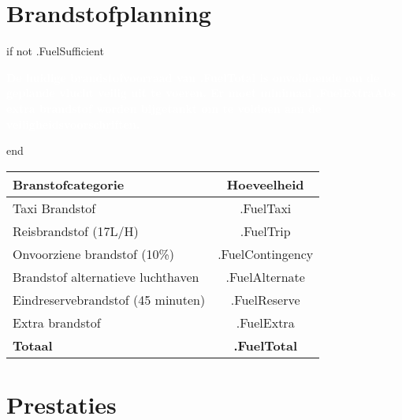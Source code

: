 \documentclass[12pt]{article}
\begin{document}
\newpage
\section*{Brandstofplanning}


{{ if not .FuelSufficient }}
{\small
\noindent
\colorbox{red!80}{%
\parbox{\textwidth}{%
\centering
{\textcolor{white}{\textbf{
De huidige brandstofvoorraad van {{ .FuelTotal }} is onvoldoende om de geplande vlucht veilig uit te
voeren. Er moet minimaal {{ .FuelExtraAbs }} extra brandstof worden bijgetankt om te voldoen
aan de veiligheidsvoorschriften.
}}}%
}%
}
}
{{ end }}

{\small
\begin{table}[H]
    \centering
    \renewcommand{\arraystretch}{1.5}
    \setlength{\tabcolsep}{10pt}
    \begin{tabular}{|l|c|}
        \hline
        \rowcolor[HTML]{AAAAAA}
        \textbf{Branstofcategorie} & \textbf{Hoeveelheid} \\ \hline
        Taxi Brandstof & {{ .FuelTaxi }}           \\ \hline
        Reisbrandstof (17L/H) & {{ .FuelTrip }}           \\ \hline
        Onvoorziene brandstof (10\%) & {{ .FuelContingency }}           \\ \hline
        Brandstof alternatieve luchthaven & {{ .FuelAlternate }}           \\ \hline
        Eindreservebrandstof (45 minuten) & {{ .FuelReserve }}           \\ \hline
        Extra brandstof & {{ .FuelExtra }}           \\ \hline
        \rowcolor[HTML]{AAAAAA}
        \textbf{Totaal} & \textbf{ {{ .FuelTotal }} } \\ \hline
    \end{tabular}
\end{table}
}

\section*{Prestaties}
\end{document}
